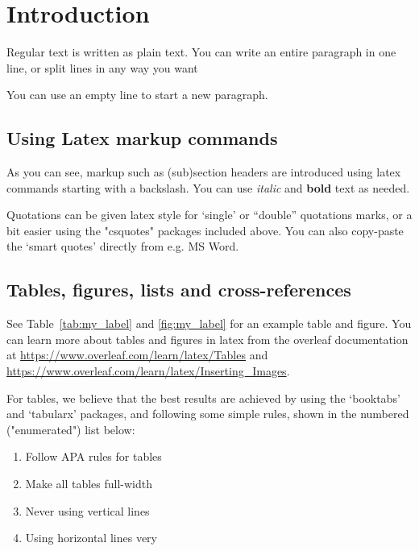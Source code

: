 
\section{Introduction}

Regular text is written as plain text. 
You can write an entire paragraph in one line, 
or split lines in any way you want

You can use an empty line to start a new paragraph.

\subsection{Using Latex markup commands}

As you can see, markup such as (sub)section headers are introduced using latex commands starting with a backslash.
You can use \textit{italic} and \textbf{bold} text as needed. 

Quotations can be given latex style for `single' or ``double'' quotations marks,
or a bit easier using the "csquotes" packages included above.
You can also copy-paste the ‘smart quotes’ directly from e.g. MS Word.

\subsection{Tables, figures, lists and cross-references}

See Table~\ref{tab:my_label} and \ref{fig:my_label} for an example table and figure.
You can learn more about tables and figures in latex from the overleaf documentation at
\url{https://www.overleaf.com/learn/latex/Tables} and \url{https://www.overleaf.com/learn/latex/Inserting_Images}.

For tables, we believe that the best results are achieved by using the `booktabs' and `tabularx' packages,
and following some simple rules, shown in the numbered ("enumerated") list below:
\begin{enumerate}
    \item Follow APA rules for tables
    \item Make all tables full-width
    \item Never using vertical lines
    \item Using horizontal lines very 
\end{enumerate}

